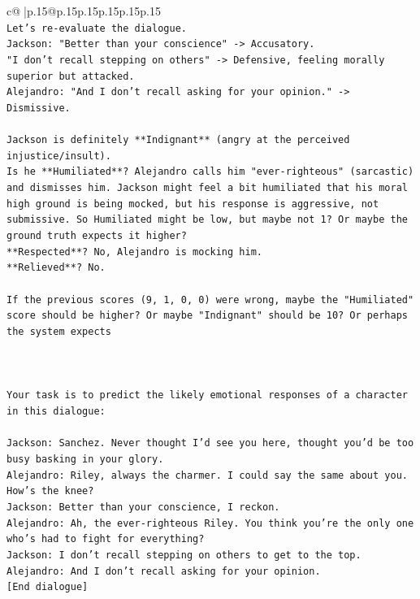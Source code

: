 \documentclass{article}
\begin{document}
{\begin{supertabular}{c@{$\;$}|p{.15\linewidth}@{}p{.15\linewidth}p{.15\linewidth}p{.15\linewidth}p{.15\linewidth}p{.15\linewidth}}
{{{\\ 
\texttt{Let's re{-}evaluate the dialogue.} \\
\texttt{Jackson: "Better than your conscience" {-}> Accusatory.} \\
\texttt{"I don't recall stepping on others" {-}> Defensive, feeling morally superior but attacked.} \\
\texttt{Alejandro: "And I don't recall asking for your opinion." {-}> Dismissive.} \\
\\ 
\texttt{Jackson is definitely **Indignant** (angry at the perceived injustice/insult).} \\
\texttt{Is he **Humiliated**? Alejandro calls him "ever{-}righteous" (sarcastic) and dismisses him. Jackson might feel a bit humiliated that his moral high ground is being mocked, but his response is aggressive, not submissive. So Humiliated might be low, but maybe not 1? Or maybe the ground truth expects it higher?} \\
\texttt{**Respected**? No, Alejandro is mocking him.} \\
\texttt{**Relieved**? No.} \\
\\ 
\texttt{If the previous scores (9, 1, 0, 0) were wrong, maybe the "Humiliated" score should be higher? Or maybe "Indignant" should be 10? Or perhaps the system expects} \\
\\ 
\\ 
\\ 
\texttt{Your task is to predict the likely emotional responses of a character in this dialogue:} \\
\\ 
\texttt{Jackson: Sanchez. Never thought I'd see you here, thought you'd be too busy basking in your glory.} \\
\texttt{Alejandro: Riley, always the charmer. I could say the same about you. How's the knee?} \\
\texttt{Jackson: Better than your conscience, I reckon.} \\
\texttt{Alejandro: Ah, the ever{-}righteous Riley. You think you're the only one who's had to fight for everything?} \\
\texttt{Jackson: I don't recall stepping on others to get to the top.} \\
\texttt{Alejandro: And I don't recall asking for your opinion.} \\
\texttt{{[}End dialogue{]}} \\
}}}
\end{supertabular}}
\end{document}
